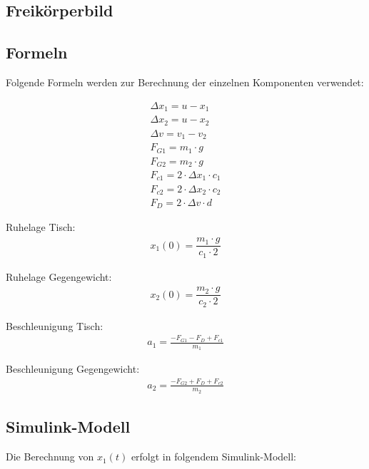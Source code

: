 \documentclass[]{scrartcl}
\begin{document}
\subsection{Freikörperbild}

\subsection{Formeln}
Folgende Formeln werden zur Berechnung der einzelnen Komponenten verwendet:

\begin{align}
\Delta x_{1} = u - x_{1} \\
\Delta x_{2} = u - x_{2}\\
\Delta v = v_{1} - v_{2}\\
F_{G1} = m_{1} \cdot g\\
F_{G2} = m_{2} \cdot g\\
F_{c1} = 2 \cdot \Delta x_{1} \cdot c_{1}\\
F_{c2} = 2 \cdot \Delta x_{2} \cdot c_{2}\\
F_{D} = 2 \cdot \Delta v \cdot d
\end{align}

Ruhelage Tisch:
\begin{align}
x_{1}(0) = \dfrac{m_{1} \cdot g}{c_{1} \cdot 2}
\end{align}

Ruhelage Gegengewicht:
\begin{align}
x_{2}(0) = \dfrac{m_{2} \cdot g}{c_{2} \cdot 2}
\end{align}

Beschleunigung Tisch:
\begin{align}
a_{1} = \frac{-F_{G1} - F_{D} + F_{c1}}{m_{1}}
\end{align}

Beschleunigung Gegengewicht:
\begin{align}
a_{2} = \frac{-F_{G2} + F_{D} + F_{c2}}{m_{2}}
\end{align}

\subsection{Simulink-Modell}
Die Berechnung von $x_{1}(t)$ erfolgt in folgendem Simulink-Modell:
\end{document}
